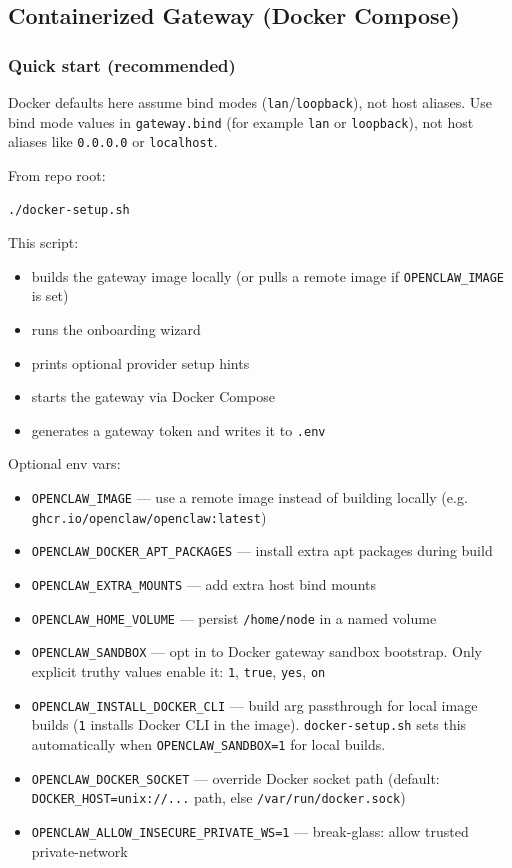 \subsection{Containerized Gateway (Docker Compose)}


\subsubsection{Quick start (recommended)}


Docker defaults here assume bind modes (\texttt{lan}/\texttt{loopback}), not host aliases. Use bind
mode values in \texttt{gateway.bind} (for example \texttt{lan} or \texttt{loopback}), not host aliases like
\texttt{0.0.0.0} or \texttt{localhost}.

From repo root:

\begin{lstlisting}[language=bash]
./docker-setup.sh
\end{lstlisting}


This script:

\begin{itemize}
  \item builds the gateway image locally (or pulls a remote image if \texttt{OPENCLAW\_IMAGE} is set)
  \item runs the onboarding wizard
  \item prints optional provider setup hints
  \item starts the gateway via Docker Compose
  \item generates a gateway token and writes it to \texttt{.env}
\end{itemize}


Optional env vars:

\begin{itemize}
  \item \texttt{OPENCLAW\_IMAGE} — use a remote image instead of building locally (e.g. \texttt{ghcr.io/openclaw/openclaw:latest})
  \item \texttt{OPENCLAW\_DOCKER\_APT\_PACKAGES} — install extra apt packages during build
  \item \texttt{OPENCLAW\_EXTRA\_MOUNTS} — add extra host bind mounts
  \item \texttt{OPENCLAW\_HOME\_VOLUME} — persist \texttt{/home/node} in a named volume
  \item \texttt{OPENCLAW\_SANDBOX} — opt in to Docker gateway sandbox bootstrap. Only explicit truthy values enable it: \texttt{1}, \texttt{true}, \texttt{yes}, \texttt{on}
  \item \texttt{OPENCLAW\_INSTALL\_DOCKER\_CLI} — build arg passthrough for local image builds (\texttt{1} installs Docker CLI in the image). \texttt{docker-setup.sh} sets this automatically when \texttt{OPENCLAW\_SANDBOX=1} for local builds.
  \item \texttt{OPENCLAW\_DOCKER\_SOCKET} — override Docker socket path (default: \texttt{DOCKER\_HOST=unix://...} path, else \texttt{/var/run/docker.sock})
  \item \texttt{OPENCLAW\_ALLOW\_INSECURE\_PRIVATE\_WS=1} — break-glass: allow trusted private-network
\end{itemize}

